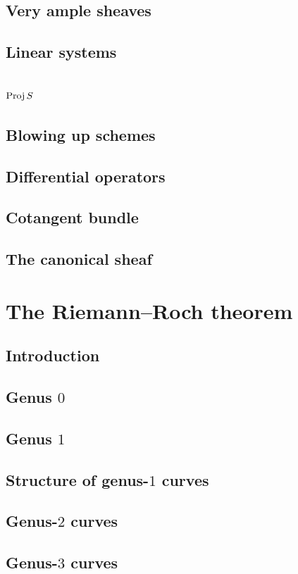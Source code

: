 \documentclass[11pt, oneside,margin=1in]{article}
\begin{document}
\subsection{Very ample sheaves}
\subsection{Linear systems}
\subsection{$\operatorname{Proj} S$}
\subsection{Blowing up schemes}
\subsection{Differential operators}
\subsection{Cotangent bundle}
\subsection{The canonical sheaf}
\section{The Riemann--Roch theorem}
\subsection{Introduction}
\subsection{Genus $0$}
\subsection{Genus $1$}
\subsection{Structure of genus-$1$ curves}
\subsection{Genus-$2$ curves}
\subsection{Genus-$3$ curves}
\end{document}
